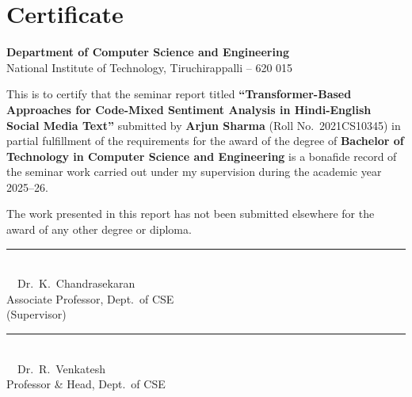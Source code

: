 \documentclass[12pt,a4paper]{report}
\begin{document}
\chapter*{Certificate}

\vspace{10pt}
\begin{center}
{\large\bfseries\color{accent} Department of Computer Science and Engineering}\\[4pt]
{\color{graytext} National Institute of Technology, Tiruchirappalli -- 620 015}
\end{center}

\vspace{16pt}

\noindent This is to certify that the seminar report titled \textbf{``Transformer-Based Approaches for Code-Mixed Sentiment Analysis in Hindi-English Social Media Text''} submitted by \textbf{Arjun Sharma} (Roll No.\ 2021CS10345) in partial fulfillment of the requirements for the award of the degree of \textbf{Bachelor of Technology in Computer Science and Engineering} is a bonafide record of the seminar work carried out under my supervision during the academic year 2025--26.

\vspace{10pt}
\noindent The work presented in this report has not been submitted elsewhere for the award of any other degree or diploma.

\vspace{28pt}

\noindent
\begin{minipage}[t]{0.48\textwidth}
  \centering
  \rule{0.7\textwidth}{0.4pt}\\[4pt]
  {\small\color{graytext} \faChalkboardTeacher\ \ Dr.\ K.\ Chandrasekaran}\\[2pt]
  {\footnotesize\color{graytext} Associate Professor, Dept.\ of CSE}\\[2pt]
  {\footnotesize\color{graytext} (Supervisor)}
\end{minipage}
\hfill
\begin{minipage}[t]{0.48\textwidth}
  \centering
  \rule{0.7\textwidth}{0.4pt}\\[4pt]
  {\small\color{graytext} \faUser\ \ Dr.\ R.\ Venkatesh}\\[2pt]
  {\footnotesize\color{graytext} Professor \& Head, Dept.\ of CSE}
\end{minipage}

\vspace{24pt}
\end{document}
